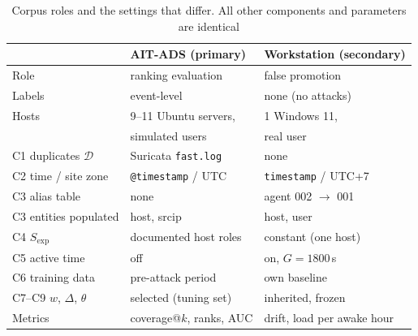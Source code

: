 \documentclass[conference]{IEEEtran}
\begin{document}
\begin{table}[t]
\caption{Corpus roles and the settings that differ. All other components and parameters are identical}
\label{tab:corpora}
\centering\footnotesize
\setlength{\tabcolsep}{3pt}
\begin{tabular}{@{}lll@{}}
\toprule
& \textbf{AIT-ADS (primary)} & \textbf{Workstation (secondary)} \\
\midrule
Role & ranking evaluation & false promotion \\
Labels & event-level & none (no attacks) \\
Hosts & 9--11 Ubuntu servers, & 1 Windows 11, \\
 & simulated users & real user \\
\midrule
C1 duplicates $\mathcal{D}$ & Suricata \texttt{fast.log} & none \\
C2 time / site zone & \texttt{@timestamp} / UTC & \texttt{timestamp} / UTC+7 \\
C3 alias table & none & agent 002 $\to$ 001 \\
C3 entities populated & host, srcip & host, user \\
C4 $S_\mathrm{exp}$ & documented host roles & constant (one host) \\
C5 active time & off & on, $G = 1800$\,s \\
C6 training data & pre-attack period & own baseline \\
C7--C9 $w$, $\Delta$, $\theta$ & selected (tuning set) & inherited, frozen \\
\midrule
Metrics & coverage@$k$, ranks, AUC & drift, load per awake hour \\
\bottomrule
\end{tabular}
\end{table}
\end{document}
